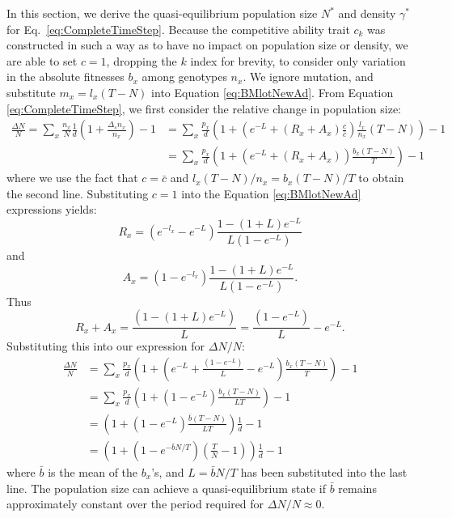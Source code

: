 \documentclass[9pt,twocolumn,twoside,lineno]{gsajnl}
\begin{document}
In this section, we derive the quasi-equilibrium population size $N^*$ and density $\gamma^*$ for Eq.~\eqref{eq:CompleteTimeStep}. Because the competitive ability trait $c_k$ was constructed in such a way as to have no impact on population size or density, we are able to set $c=1$, dropping the $k$ index for brevity, to consider only variation in the absolute fitnesses $b_x$ among genotypes $n_x$. We ignore mutation, and substitute $m_x=l_x (T-N)$ into Equation \ref{eq:BMlotNewAd}. From Equation \ref{eq:CompleteTimeStep}, we first consider the relative change in population size:
\[
\begin{aligned}
\frac{\Delta N}{N} = \sum_x \frac{n_x}{N} \frac{1}{d}\left(1+ \frac{\Delta_s n_x}{n_x}\right)-1 &= \sum_x \frac{p_x}{d}\left(1+(e^{-L}+(R_x+A_x)\frac{c}{\bar{c}})\frac{l_{x}}{n_x} (T-N)\right)-1\\
&= \sum_x \frac{p_x }{d}\left(1+(e^{-L}+(R_x+A_x)) \frac{b_{x}(T-N)}{T}\right)-1
\end{aligned}
\]
where we use the fact that $c = \bar{c}$ and $l_x(T-N)/n_x = b_x(T-N)/T$ to obtain the second line. Substituting $c=1$ into the Equation \ref{eq:BMlotNewAd} expressions yields:
\[
R_x = (e^{-l_x} -e^{-L} )\frac{1-(1+L)e^{-L}}{L(1-e^{-L})} 
\]
and
\[
A_x = (1-e^{-l_x})\frac{1-(1+L)e^{-L}}{L(1-e^{-L})}.
\]
Thus 
\[
R_x + A_x = \frac{(1-(1+L)e^{-L})}{L} = \frac{(1-e^{-L})}{L}-e^{-L}.
\]
Substituting this into our expression for $\Delta N/N$:
\[
\begin{aligned}
\frac{\Delta N}{N} &= \sum_x \frac{p_x }{d}\left(1+(e^{-L}+\frac{(1-e^{-L})}{L}-e^{-L}) \frac{b_{x}(T-N)}{T}\right)-1\\
&= \sum_x \frac{p_x }{d}\left(1+(1-e^{-L})\frac{b_{x}(T-N)}{LT}\right)-1\\
&= \left(1+(1-e^{-L})\frac{\bar{b}(T-N)}{LT}\right)\frac{1}{d}-1\\
&= \left(1+(1-e^{-\bar{b}N/T})\left(\frac{T}{N}-1\right)\right)\frac{1}{d}-1
\end{aligned}
\]
where $\bar{b}$ is the mean of the $b_x$'s, and $L=\bar{b}N/T$ has been substituted into the last line. The population size can achieve a quasi-equilibrium state if $\bar{b}$ remains approximately constant over the period required for $\Delta N/N \approx 0$.
\end{document}

